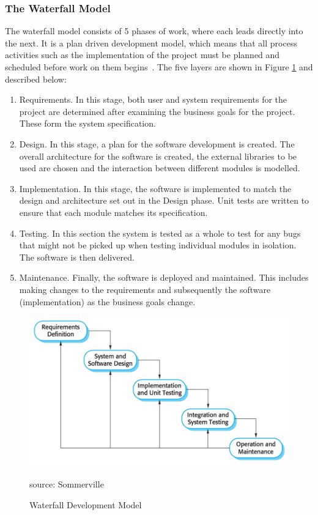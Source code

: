 \documentclass{article}
\begin{document}

\subsubsection{The Waterfall Model}
The waterfall model consists of 5 phases of work, where each leads directly into the next.  It is a plan driven development model, which means that all process activities such as the implementation of the project must be planned and scheduled before work on them begins~\cite{sommervilleSoftwareEngineering}.  The five layers are shown in Figure \ref{fig:waterfallModel} and described below:
\begin{enumerate}
  \item Requirements.  In this stage, both user and system requirements for the project are determined after examining the business goals for the project.  These form the system specification.
  \item Design.  In this stage, a plan for the software development is created.  The overall architecture for the software is created, the external libraries to be used are chosen and the interaction between different modules is modelled.
  \item Implementation.  In this stage, the software is implemented to match the design and architecture set out in the Design phase.  Unit tests are written to ensure that each module matches its specification.
  \item Testing.  In this section the system is tested as a whole to test for any bugs that might not be picked up when testing individual modules in isolation.  The software is then delivered.
  \item Maintenance.  Finally, the software is deployed and maintained.  This includes making changes to the requirements and subsequently the software (implementation) as the business goals change. ~\cite{sommervilleSoftwareEngineering}
\end{enumerate}

\begin{figure}[htb] 
\centering
    \includegraphics[width=0.8\linewidth]{waterfallModel}
\caption{Waterfall Development Model}
\small source: Sommerville~\cite{sommervilleSoftwareEngineering}
\label{fig:waterfallModel}
\end{figure}
\end{document}
